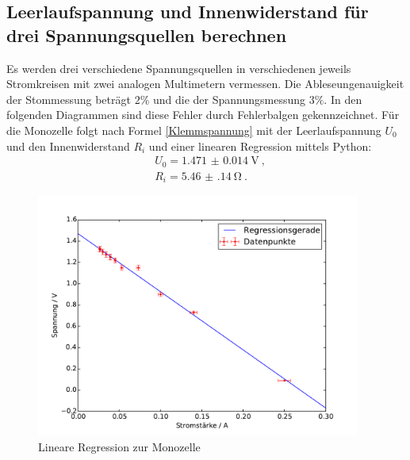\subsection{Leerlaufspannung und Innenwiderstand für drei Spannungsquellen berechnen}
Es werden drei verschiedene Spannungsquellen in verschiedenen jeweils  Stromkreisen mit zwei analogen Multimetern vermessen. Die Ableseungenauigkeit der Stommessung beträgt $2 \% $ und die der Spannungsmessung $3 \% $. In den folgenden Diagrammen sind diese Fehler durch Fehlerbalgen gekennzeichnet.
Für die Monozelle folgt nach Formel \eqref{Klemmspannung} mit der Leerlaufspannung $U_0$ und den Innenwiderstand $R_i$ und einer linearen Regression mittels Python:
\begin{align}
&U_0 = \SI{1.471(14)}{\volt}  \ ,  \\
&R_i = \SI{5.46(14)}{\ohm}  \ .
\label{Innenwiderstand_Monozelle}
\end{align}
\begin{figure}[h!]
	\centering
	\includegraphics[width=0.95\textwidth]{Spannung_Messung_b.pdf}
	\caption{Lineare Regression zur Monozelle}
	\label{fig:L_kleiner_Druck}
\end{figure}


